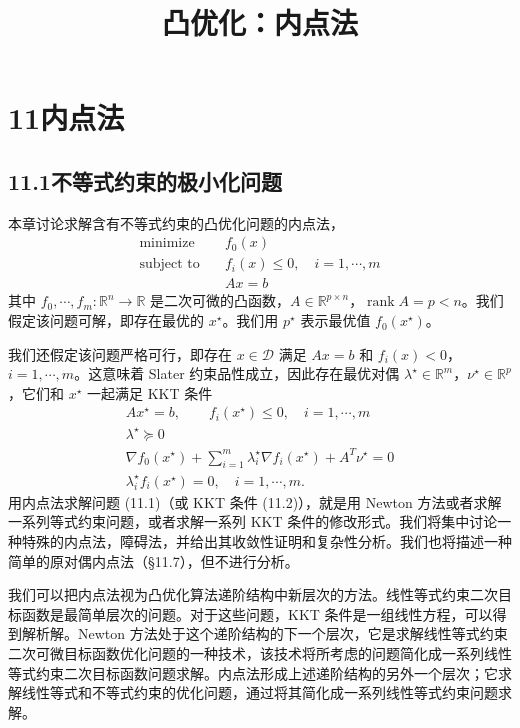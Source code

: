 \documentclass[UTF8, 12pt, fontset=fandol, oneside]{ctexart}
\title{凸优化：内点法}
\author{}
\date{}
\begin{document}
\maketitle

\section*{11\quad 内点法}

\subsection*{11.1\quad 不等式约束的极小化问题}

本章讨论求解含有不等式约束的凸优化问题的内点法，
\begin{equation}
\begin{aligned}
\text{minimize}\quad & f_0(x)\\
\text{subject to}\quad & f_i(x)\leq 0,\quad i=1,\cdots,m\\
& Ax=b
\end{aligned}
\tag{11.1}
\end{equation}
其中 $f_0,\cdots,f_m:\mathbb{R}^n\to\mathbb{R}$ 是二次可微的凸函数，$A\in\mathbb{R}^{p\times n}$，$\operatorname{rank}A=p<n$。我们假定该问题可解，即存在最优的 $x^\star$。我们用 $p^\star$ 表示最优值 $f_0(x^\star)$。

我们还假定该问题严格可行，即存在 $x\in\mathcal{D}$ 满足 $Ax=b$ 和 $f_i(x)<0$，$i=1,\cdots,m$。这意味着 Slater 约束品性成立，因此存在最优对偶 $\lambda^\star\in\mathbb{R}^m$，$\nu^\star\in\mathbb{R}^p$，它们和 $x^\star$ 一起满足 KKT 条件
\begin{equation}
\begin{gathered}
Ax^\star=b,\qquad f_i(x^\star)\leq 0,\quad i=1,\cdots,m\\
\lambda^\star\succeq 0\\
\nabla f_0(x^\star)+\sum_{i=1}^m\lambda_i^\star\nabla f_i(x^\star)+A^T\nu^\star=0\\
\lambda_i^\star f_i(x^\star)=0,\quad i=1,\cdots,m.
\end{gathered}
\tag{11.2}
\end{equation}
用内点法求解问题 (11.1)（或 KKT 条件 (11.2)），就是用 Newton 方法或者求解一系列等式约束问题，或者求解一系列 KKT 条件的修改形式。我们将集中讨论一种特殊的内点法，障碍法，并给出其收敛性证明和复杂性分析。我们也将描述一种简单的原对偶内点法（\S11.7），但不进行分析。

我们可以把内点法视为凸优化算法递阶结构中新层次的方法。线性等式约束二次目标函数是最简单层次的问题。对于这些问题，KKT 条件是一组线性方程，可以得到解析解。Newton 方法处于这个递阶结构的下一个层次，它是求解线性等式约束二次可微目标函数优化问题的一种技术，该技术将所考虑的问题简化成一系列线性等式约束二次目标函数问题求解。内点法形成上述递阶结构的另外一个层次；它求解线性等式和不等式约束的优化问题，通过将其简化成一系列线性等式约束问题求解。
\end{document}

